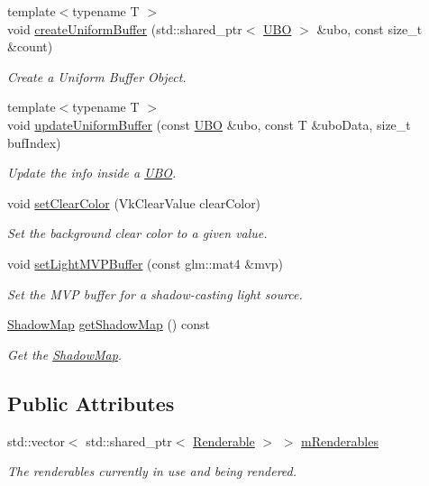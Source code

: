 \begin{DoxyCompactItemize}
{\footnotesize template$<$typename T $>$ }\\void \mbox{\hyperlink{class_render_system_a43e41f536fee8a17796034acaeafb6e9}{create\+Uniform\+Buffer}} (std\+::shared\+\_\+ptr$<$ \mbox{\hyperlink{struct_u_b_o}{U\+BO}} $>$ \&ubo, const size\+\_\+t \&count)
\begin{DoxyCompactList}\small\item\em Create a Uniform Buffer Object. \end{DoxyCompactList}\item 
{\footnotesize template$<$typename T $>$ }\\void \mbox{\hyperlink{class_render_system_a3c3025bd7da582aef27ba42bb4f32de9}{update\+Uniform\+Buffer}} (const \mbox{\hyperlink{struct_u_b_o}{U\+BO}} \&ubo, const T \&ubo\+Data, size\+\_\+t buf\+Index)
\begin{DoxyCompactList}\small\item\em Update the info inside a \mbox{\hyperlink{struct_u_b_o}{U\+BO}}. \end{DoxyCompactList}\item 
void \mbox{\hyperlink{class_render_system_a3d3fc11d70c1b8da1178cd6f5f647c74}{set\+Clear\+Color}} (Vk\+Clear\+Value clear\+Color)
\begin{DoxyCompactList}\small\item\em Set the background clear color to a given value. \end{DoxyCompactList}\item 
void \mbox{\hyperlink{class_render_system_aad31d7e4c0a7b37fd101f3b5c13dbe12}{set\+Light\+M\+V\+P\+Buffer}} (const glm\+::mat4 \&mvp)
\begin{DoxyCompactList}\small\item\em Set the M\+VP buffer for a shadow-\/casting light source. \end{DoxyCompactList}\item 
\mbox{\hyperlink{struct_shadow_map}{Shadow\+Map}} \mbox{\hyperlink{class_render_system_a8f0624e2d58d21719611ce863eafb031}{get\+Shadow\+Map}} () const
\begin{DoxyCompactList}\small\item\em Get the \mbox{\hyperlink{struct_shadow_map}{Shadow\+Map}}. \end{DoxyCompactList}\end{DoxyCompactItemize}
\subsection*{Public Attributes}
\begin{DoxyCompactItemize}
\item 
\mbox{\label{class_render_system_aa28dd2f1b27a913f0b972f3194a74618}} 
std\+::vector$<$ std\+::shared\+\_\+ptr$<$ \mbox{\hyperlink{class_renderable}{Renderable}} $>$ $>$ \mbox{\hyperlink{class_render_system_aa28dd2f1b27a913f0b972f3194a74618}{m\+Renderables}}
\begin{DoxyCompactList}\small\item\em The renderables currently in use and being rendered. \end{DoxyCompactList}\end{DoxyCompactItemize}

